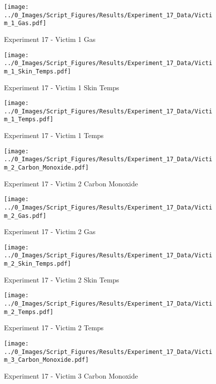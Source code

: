 	\clearpage

	\begin{figure}[H]
		\centering
		\texttt{[image: ../0\_Images/Script\_Figures/Results/Experiment\_17\_Data/Victim\_1\_Gas.pdf]}
		\caption[]{Experiment 17 - Victim 1 Gas}
	\end{figure}
 

	\begin{figure}[H]
		\centering
		\texttt{[image: ../0\_Images/Script\_Figures/Results/Experiment\_17\_Data/Victim\_1\_Skin\_Temps.pdf]}
		\caption[]{Experiment 17 - Victim 1 Skin Temps}
	\end{figure}
 
	\clearpage

	\begin{figure}[H]
		\centering
		\texttt{[image: ../0\_Images/Script\_Figures/Results/Experiment\_17\_Data/Victim\_1\_Temps.pdf]}
		\caption[]{Experiment 17 - Victim 1 Temps}
	\end{figure}
 

	\begin{figure}[H]
		\centering
		\texttt{[image: ../0\_Images/Script\_Figures/Results/Experiment\_17\_Data/Victim\_2\_Carbon\_Monoxide.pdf]}
		\caption[]{Experiment 17 - Victim 2 Carbon Monoxide}
	\end{figure}
 
	\clearpage

	\begin{figure}[H]
		\centering
		\texttt{[image: ../0\_Images/Script\_Figures/Results/Experiment\_17\_Data/Victim\_2\_Gas.pdf]}
		\caption[]{Experiment 17 - Victim 2 Gas}
	\end{figure}
 

	\begin{figure}[H]
		\centering
		\texttt{[image: ../0\_Images/Script\_Figures/Results/Experiment\_17\_Data/Victim\_2\_Skin\_Temps.pdf]}
		\caption[]{Experiment 17 - Victim 2 Skin Temps}
	\end{figure}
 
	\clearpage

	\begin{figure}[H]
		\centering
		\texttt{[image: ../0\_Images/Script\_Figures/Results/Experiment\_17\_Data/Victim\_2\_Temps.pdf]}
		\caption[]{Experiment 17 - Victim 2 Temps}
	\end{figure}
 

	\begin{figure}[H]
		\centering
		\texttt{[image: ../0\_Images/Script\_Figures/Results/Experiment\_17\_Data/Victim\_3\_Carbon\_Monoxide.pdf]}
		\caption[]{Experiment 17 - Victim 3 Carbon Monoxide}
	\end{figure}
 
